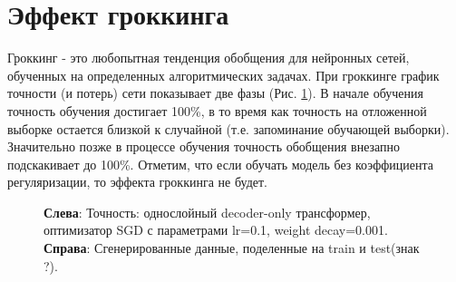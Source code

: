 \documentclass{article} %
\begin{document}
\section{Эффект гроккинга}
Гроккинг - это любопытная тенденция обобщения для нейронных сетей, обученных на определенных алгоритмических задачах. При гроккинге график точности (и потерь) сети показывает две фазы (Рис. \ref{fig:grokking_acc}). В начале обучения точность обучения достигает 100\%, в то время как точность на отложенной выборке остается близкой к случайной (т.е. запоминание обучающей выборки). Значительно позже в процессе обучения точность обобщения внезапно подскакивает до 100\%. Отметим, что если обучать модель без коэффициента регуляризации, то эффекта гроккинга не будет. 
\begin{figure}[!ht]
    \centering
    \caption{\textbf{Слева}: Точность: однослойный decoder-only трансформер, оптимизатор SGD с параметрами lr=0.1, weight decay=0.001. \textbf{Справа}: Сгенерированные данные, поделенные на train и test(знак ?).}
    \label{fig:grokking_acc}
\end{figure}
\end{document}
